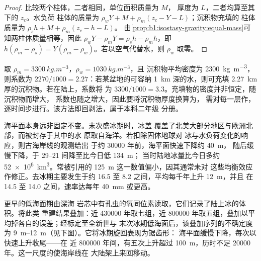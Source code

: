 \begin{proof}
比较两个柱体，二者相同，单位面积质量为 $M$，
厚度为 $L$，二者均算至其下的 $z_c$。水负荷
柱体的质量为 $\rho_w Y + M + \rho_m(z_c - Y - L)$；沉积物充填的
柱体质量为 $\rho_s h + M + \rho_m(z_c - h - L)$。
由\cref{prop:b1:isostasy-gravity:equal-mass}可知两柱体质量相等，因此
$\rho_w Y - \rho_m Y = \rho_s h - \rho_m h$，即 $h(\rho_m - \rho_s) =
Y(\rho_m - \rho_w)$。若以空气代替水，则 $\rho_w$ 取零。
\end{proof}

取 $\rho_m = \qty{3300}{kg.m^{-3}}$，$\rho_w = \qty{1030}{kg.m^{-3}}$，且
沉积物平均密度为 \qty{2300}{kg.m^{-3}}，则系数为
$2270/1000 = \num{2.27}$：若某盆地的可容纳
\qty{1}{km} 深的水，则可充填 \qty{2.27}{km} 厚的沉积物。若在陆上，系数将
为 $3300/1000 = \num{3.3}$。充填物的密度并非恒定，随沉积物而增大，
系数也随之增大，因此要将沉积物厚度换算为，
需对每一层作，
逐时间步进行。该方法即回剥法，属于本科二年级
分册。

海平面本身远非固定不变。末次盛冰期时，冰盖
覆盖了北美大部分地区与欧洲北部，而被封存于其中的水
原取自海洋。若扣除固体地球对
冰与水负荷变化的响应，则古海岸线的观测给出
于约 \num{30000} 年前，海平面快速下降约 \qty{40}{m}，
随后缓慢下降，于 \qtyrange{29}{21}{\ka} 间降至比今日低 \qty{134}{m}；
当时陆地冰量比今日多约 \qty{52e6}{km^3}。常被引用的
\qty{125}{m} 这一数值偏小，因其通常未对
这些均衡效应作修正。去冰期主要发生于约 \qty{16.5}{\ka}
至 \qty{8.2}{\ka} 之间，平均每千年上升 \qty{12}{m}，并且
在 \qty{14.5}{\ka} 至 \qty{14.0}{\ka} 之间，速率达每年 \qty{40}{mm} 或更高。

更早的低海面期由深海
岩芯中有孔虫的氧同位素读取，它们记录了陆上冰的体积。将此类
重建结果叠加：近 \num{430000} 年取七组，近
\num{800000} 年取五组，叠加以平均掉各自的误差；经标定至全新世与
末次冰期低海面后，该叠加序列的不确定度为
\qtyrange{9}{12}{m}（见下图）。它将冰期旋回表现为锯齿形：
海平面缓慢下降，每次以快速上升收尾——在
近 \num{800000} 年间，有五次上升超过 \qty{100}{m}，历时不足 \num{20000}
年。这一尺度的使海岸线在
大陆架上来回移动。

